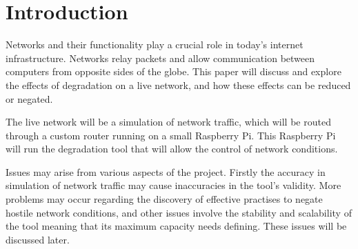 \chapter{Introduction}
Networks and their functionality play a crucial role in today's internet infrastructure. Networks relay packets and allow communication between computers from opposite sides of the globe. This paper will discuss and explore the effects of degradation on a live network, and how these effects can be reduced or negated. 

The live network will be a simulation of network traffic, which will be routed through a custom router running on a small Raspberry Pi. This Raspberry Pi will run the degradation tool that will allow the control of network conditions. 

Issues may arise from various aspects of the project. Firstly the accuracy in simulation of network traffic may cause inaccuracies in the tool's validity. More problems may occur regarding the discovery of effective practises to negate hostile network conditions, and other issues involve the stability and scalability of the tool meaning that its maximum capacity needs defining. These issues will be discussed later.
